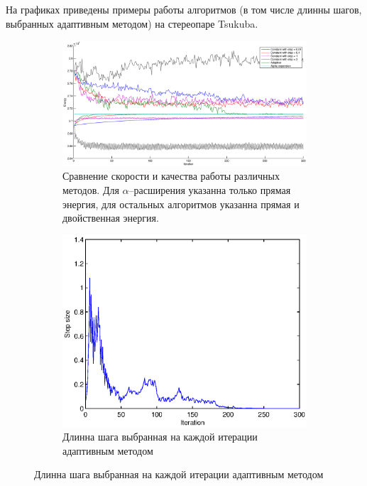 \documentclass{article}
\begin{document}
На графиках приведены примеры работы алгоритмов (в том числе
длинны шагов, выбранных адаптивным методом) на стереопаре Tsukuba.
\begin{figure}
    \centering
    \begin{subfigure}[t]{\textwidth}
            \centering
            \includegraphics[width=\textwidth]{comparative.eps}
            \caption{Сравнение скорости и качества работы различных методов.
                    Для $\alpha$--расширения указанна только прямая энергия,
                    для остальных алгоритмов указанна прямая и двойственная энергия.}
    \end{subfigure}
    \begin{subfigure}[t]{\textwidth}
            \centering
            \includegraphics[width=\textwidth]{adaptive_step.eps}
            \caption{Длинна шага выбранная на каждой итерации адаптивным методом}
    \end{subfigure}
\end{figure}
\end{document}
